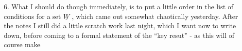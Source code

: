 6.    What I should do though immediately,  is to put a little order
 in the list of  conditions for a set $\underline{W}$ ,  which came out
somewhat chaotically yesterday.  After the notes I still did a little
scratch work last night,  which I want now to write down,  before coming
to a formal statement of the ``key resut''  -  as this will of course make

